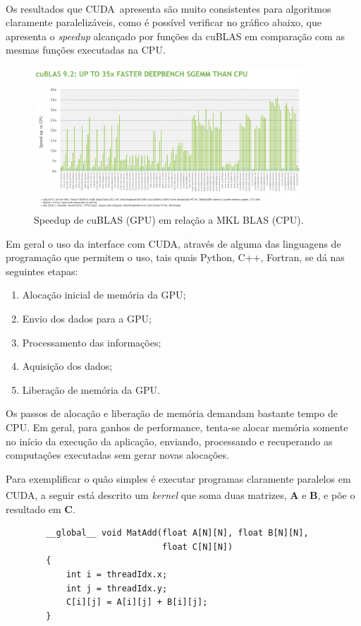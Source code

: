 \documentclass[cic,tc]{iiufrgs}
\newcommand{\mat}[1]{\bm{#1}}
\newcommand{\reg}{\textsuperscript{\textregistered}}
\begin{document}
Os resultados que CUDA\reg~apresenta são muito consistentes para algoritmos claramente
paralelizáveis, como é possível verificar no gráfico abaixo, que apresenta o 
\emph{speedup} alcançado por funções da cuBLAS em comparação com as mesmas funções 
executadas na CPU.
\begin{figure}[H]
    \caption{Speedup de cuBLAS (GPU) em relação a MKL BLAS (CPU).}
    \begin{center}
        \includegraphics[width=0.9\textwidth]{img/cublas9_2.png}
    \end{center}
\end{figure}


Em geral o uso da interface com CUDA, através de alguma das linguagens de programação 
que permitem o uso, tais quais Python, C++, Fortran, se dá nas seguintes etapas:
\begin{enumerate}
    \item Alocação inicial de memória da GPU;
    \item Envio dos dados para a GPU;
    \item Processamento das informações;
    \item Aquisição dos dados;
    \item Liberação de memória da GPU.
\end{enumerate}

Os passos de alocação e liberação de memória demandam bastante tempo de CPU.
Em geral, para ganhos de performance, tenta-se alocar memória somente no início da
execução da aplicação, enviando, processando e recuperando as computações executadas 
sem gerar novas alocações.

Para exemplificar o quão simples é executar programas claramente paralelos em 
CUDA\reg, a seguir está descrito um \textit{kernel} que soma duas matrizes,
$\mat{A}$ e $\mat{B}$, e põe o resultado em $\mat{C}$.
\begin{center}
    \begin{lstlisting}
        __global__ void MatAdd(float A[N][N], float B[N][N],
                               float C[N][N])
        {
            int i = threadIdx.x;
            int j = threadIdx.y;
            C[i][j] = A[i][j] + B[i][j];
        }
        \end{lstlisting}
\end{center}
\end{document}
